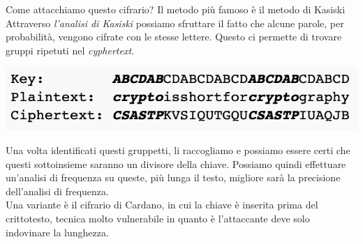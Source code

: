 \documentclass[11pt, oneside]{article}   	%
\begin{document}
Come attacchiamo questo cifrario? Il metodo più famoso è il metodo di Kasiski\\
Attraverso \emph{l'analisi di Kasiski} possiamo sfruttare il fatto che alcune parole, per probabilità, vengono cifrate con le stesse lettere. Questo ci permette di trovare gruppi ripetuti nel \emph{cyphertext}.
\begin{center}
\includegraphics[scale=0.7]{freq}
\end{center}
Una volta identificati questi gruppetti, li raccogliamo e possiamo essere certi che questi sottoinsieme saranno un divisore della chiave. Possiamo quindi effettuare un'analisi di frequenza su queste, più lunga il testo, migliore sarà la precisione dell'analisi di frequenza.\\
Una variante è il cifrario di Cardano, in cui la chiave è inserita prima del crittotesto, tecnica molto vulnerabile in quanto è l'attaccante deve solo indovinare la lunghezza.
\end{document}
